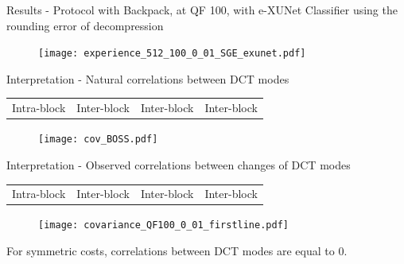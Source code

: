 \documentclass[10pt,aspectratio=169]{beamer}
\begin{document}
\begin{frame}{Results - Protocol with Backpack, at QF 100, with e-XUNet}
Classifier using the rounding error of decompression~
    \begin{figure}[h]
        \texttt{[image: experience\_512\_100\_0\_01\_SGE\_exunet.pdf]}
    \end{figure}
\end{frame}


\begin{frame}{Interpretation - Natural correlations between DCT modes~}
    \begin{tabularx}{0.9\textwidth} { 
        >{\centering\arraybackslash}X 
        >{\centering\arraybackslash}X 
        >{\centering\arraybackslash}X
        >{\centering\arraybackslash}X  }
        Intra-block & Inter-block & Inter-block & Inter-block \\ 
   \end{tabularx}

    \begin{figure}[h]
        \texttt{[image: cov\_BOSS.pdf]}
    \end{figure}
\end{frame}


\begin{frame}{Interpretation - Observed correlations between changes of DCT modes}
        

    \begin{tabularx}{0.9\textwidth} { 
         >{\centering\arraybackslash}X 
         >{\centering\arraybackslash}X 
         >{\centering\arraybackslash}X
         >{\centering\arraybackslash}X  }
         Intra-block & Inter-block & Inter-block & Inter-block \\ 
    \end{tabularx}

    \begin{figure}[h]
        \texttt{[image: covariance\_QF100\_0\_01\_firstline.pdf]}
    \end{figure}

    \pause
    For symmetric costs, correlations between DCT modes are equal to 0. 
    
\end{frame}
\end{document}
